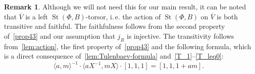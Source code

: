 \documentclass[oneside, 8pt]{amsart}
\theoremstyle{remark}
\theoremstyle{definition}
\numberwithin{lemma}{section}
\numberwithin{prop}{section}
\numberwithin{corollary}{section}
\numberwithin{externaltheorem}{section}
\newtheorem{rem}[lemma]{Remark}
\DeclareMathOperator{\St}{St}
\numberwithin{equation}{section}
\begin{document}
\begin{rem}
Although we will not need this for our main result, it can be noted that $\overline{V}$ is a left $\St(\Phi, B)$-torsor, i.\,e. the action of $\St(\Phi, B)$ on $\overline{V}$ is both transitive and faithful. The faithfulness follows from the second property of~\cref{prop43} and our assumption that $j_R$ is injective.
The transitivity follows from~\cref{lem:action}, the first property of~\cref{prop43} and the following formula, which is a direct consequence of~\cref{lem:Tulenbaev-formula} and~\eqref{T_1}--\eqref{T_leq0}:
\begin{equation*} \langle a, m \rangle^{-1} \cdot \langle aX^{-1}, mX \rangle \cdot [1, 1, 1] = [1, 1, 1+am]. \end{equation*} \end{rem}

\begin{comment}
\begin{equation} \label{T_2} t_\alpha(aX^{-1}) (g, h, u) = \left[ x_\alpha(aX^{-1})\cdot g \cdot x_\alpha\left(-\tfrac{aX^{-1}}{1 + am}\right) \{ X, 1+am \} ,\ x_\alpha\left(\tfrac{aX^{-1}}{1 + am}\right) h ,\ u \cdot (1 + am)\right].\end{equation}

\begin{multline*}
 t_\alpha(aX^{-1}) (x_{-\alpha}(mX), 1, 1) = \left[ x_\alpha(aX^{-1})\cdot x_{-\alpha}(mX) \cdot x_\alpha\left(-\tfrac{aX^{-1}}{1 + am}\right) \{ X, 1+am \} ,\ x_\alpha\left(\tfrac{aX^{-1}}{1 + am}\right),\  (1 + am)\right] = \\
 = \left[ x_{-\alpha}\left(\tfrac{mX}{1+am}\right) \cdot \langle a, m\rangle_\alpha \cdot h_\alpha(1+am) ,\ x_\alpha\left(\tfrac{aX^{-1}}{1 + am}\right),\  (1 + am)\right]
\end{multline*}

This implies that 
\begin{multline*} x_{\alpha}\left(\tfrac{-aX^{-1}}{1+am}\right) \cdot h_\alpha(1+am)^{-1} \cdot \langle a, m \rangle^{-1} \cdot x_{-\alpha}\left(\tfrac{-mX}{1+am}\right) x_\alpha(aX^{-1}) \cdot x_{-\alpha}(mX) [1, 1, 1] = [1, 1, 1+am]
\end{multline*}

\begin{equation} \langle a,m \rangle _ \alpha = x_{-\alpha}\left(\tfrac{- m}{1 + am}\right) \cdot x_{\alpha}(a) \cdot x_{-\alpha}(m) \cdot x_{\alpha}\left(\tfrac{- a}{1+am}\right) \cdot h_{\alpha}^{-1}(1 + am). \end{equation} 
\begin{equation} \langle a,m \rangle _ \alpha ^{-1} =  h_{\alpha}(1 + am) \cdot x_{\alpha}\left(\tfrac{a}{1+am}\right) \cdot x_{-\alpha}(-m) \cdot x_{\alpha}(-a) \cdot x_{-\alpha}\left(\tfrac{m}{1 + am}\right). \end{equation} 
\end{comment}
\end{document}
